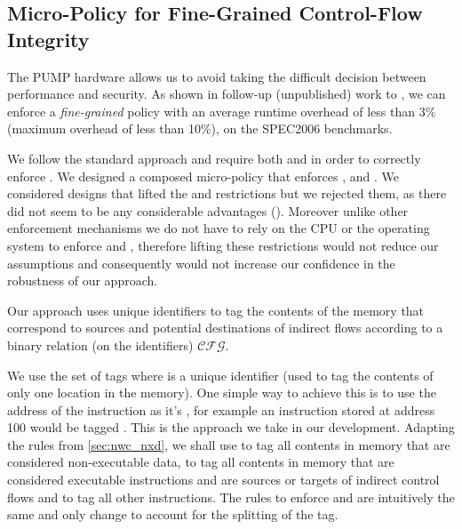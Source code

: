 \subsection{Micro-Policy for Fine-Grained Control-Flow Integrity}
\label{sec:cfi_fine}


The PUMP hardware allows us to avoid taking the difficult decision
between performance and security. As shown in follow-up (unpublished)
work to \cite{pump_hasp2014}, we can enforce a \emph{fine-grained}
\CFI policy with an average runtime overhead of less than 3\% (maximum
overhead of less than 10\%), on the SPEC2006 benchmarks.

We follow the standard approach and require both \NXD and \NWC in
order to correctly enforce \CFI. We designed a composed micro-policy
that enforces \NXD, \NWC and \CFI. We considered designs that lifted
the \NXD and \NWC restrictions but we rejected them, as there did not
seem to be any considerable advantages (). Moreover unlike
other \CFI enforcement mechanisms we do not have to rely on the CPU or
the operating system to enforce \NXD and \NWC, therefore lifting these
restrictions would not reduce our assumptions and consequently would
not increase our confidence in the robustness of our approach.



Our approach uses unique identifiers to tag the contents of the memory that
correspond to sources and potential destinations of indirect flows according to
a binary relation (on the identifiers) $\mathcal{CFG}$.

We use the set of tags 
where \id is a unique identifier (\IE used to tag the contents of only
one location in the memory). One simple way to achieve this is to use
the address of the instruction as it's \id, for example an instruction
stored at address 100 would be tagged . This is the
approach we take in our development. Adapting the rules from
\ref{sec:nwc_nxd}, we shall use \DATAname to tag all contents in
memory that are considered non-executable data,  to tag
all contents in memory that are considered executable instructions and
are sources or targets of indirect control flows and \INSTR{$\bot$} to
tag all other instructions. The rules to enforce \NWC and \NXD are
intuitively the same and only change to account for the splitting of
the \INSTRname tag.

